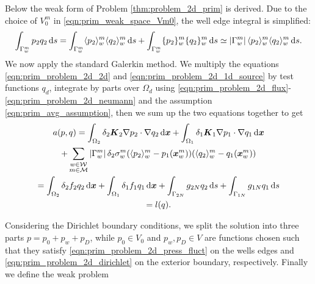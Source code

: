 Below the weak form of Problem \ref{thm:problem_2d_prim} is derived.
Due to the choice of $V^m_0$ in \eqref{eqn:prim_weak_space_Vm0},
the well edge integral is simplified:
\begin{equation} \label{eqn:prim_avg_assumption}
    \int_{\Gamma^m_w} p_2q_2 \dd s %
    =  \int_{\Gamma^m_w} \avg{p_2}^m_w\avg{q_2}^m_w \dd s + \int_{\Gamma^m_w} \fluct{p_2}^m_w\fluct{q_2}^m_w \dd s \simeq \abs{\Gamma^m_w} \avg{p_2}^m_w\avg{q_2}^m_w \dd s.
\end{equation}
We now apply the standard Galerkin method. We multiply the equations \eqref{eqn:prim_problem_2d_2d} and \eqref{eqn:prim_problem_2d_1d_source}
by test functions $q_d$, integrate by parts over $\Omega_d$ using \eqref{eqn:prim_problem_2d_flux}-\eqref{eqn:prim_problem_2d_neumann} and the assumption \eqref{eqn:prim_avg_assumption}, 
then we sum up the two equations together to get
\begin{multline} \label{eqn:prim_weak_form}
  a(p,q) =
  \int_{\Omega_2} \delta_2 \mathbf{\boldsymbol{K}}_2 \nabla p_2 \cdot \nabla q_2 \,{\rm d}\mathbf{\boldsymbol{x}}
  + \int_{\Omega_1} \delta_1 \mathbf{\boldsymbol{K}}_1 \nabla p_1 \cdot \nabla q_1 \,{\rm d}\mathbf{\boldsymbol{x}} \\
  + \sum_{\substack{w\in \mathcal{W} \\ m\in \mathcal{M}}} \left|\Gamma^m_w\right| \delta_2 \sigma^m_w (\langle p_2\rangle^m_w - p_1(\mathbf{\boldsymbol{x}}^m_w)) (\langle q_2\rangle^m_w - q_1(\mathbf{\boldsymbol{x}}^m_w)) \\
  = \int_{\Omega_2} \delta_2 f_2 q_2 \,{\rm d}\mathbf{\boldsymbol{x}} + \int_{\Omega_1} \delta_1 f_1 q_1 \,{\rm d}\mathbf{\boldsymbol{x}}
  + \int_{\Gamma_{2N}} g_{2N}q_2 \,{\rm d} s + \int_{\Gamma_{1N}} g_{1N}q_1 \,{\rm d} s \\
  = l(q).
\end{multline}


Considering the Dirichlet boundary conditions, we split the solution into three parts $p=p_0 + p_w + p_D$, while
$p_0\in V_0$ and $p_w, p_D\in V$ are functions chosen such that they satisfy \eqref{eqn:prim_problem_2d_press_fluct} on the wells edges and
\eqref{eqn:prim_problem_2d_dirichlet} on the exterior boundary, respectively.
Finally we define the weak problem


